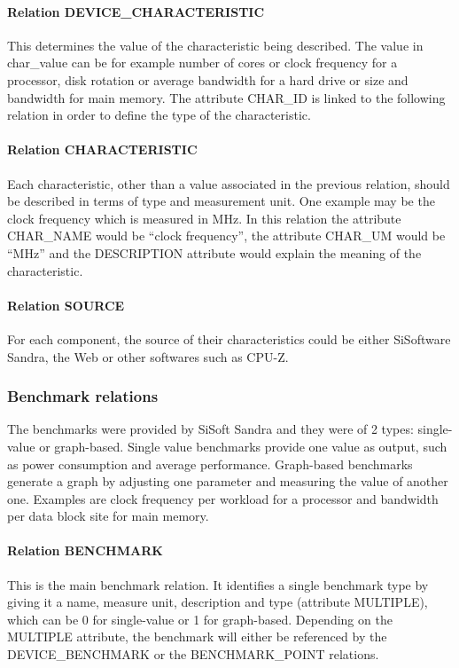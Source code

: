         \paragraph*{Relation DEVICE\_CHARACTERISTIC}
            This determines the value of the characteristic being described. The value in char_value can be for example number of cores or clock frequency for a processor, disk rotation or average bandwidth for a hard drive or size and bandwidth for main memory. The attribute CHAR_ID is linked to the following relation in order to define the type of the characteristic.
            
        \paragraph*{Relation CHARACTERISTIC}
            Each characteristic, other than a value associated in the previous relation, should be described in terms of type and measurement unit. One example may be the clock frequency which is measured in MHz. In this relation the attribute CHAR_NAME would be ``clock frequency'', the attribute CHAR_UM would be ``MHz'' and the DESCRIPTION attribute would explain the meaning of the characteristic.
            
        \paragraph*{Relation SOURCE}
            For each component, the source of their characteristics could be either SiSoftware Sandra, the Web or other softwares such as CPU-Z.
            
    \subsubsection*{Benchmark relations}
        The benchmarks were provided by SiSoft Sandra and they were of 2 types: single-value or graph-based. Single value benchmarks provide one value as output, such as power consumption and average performance. Graph-based benchmarks generate a graph by adjusting one parameter and measuring the value of another one. Examples are clock frequency per workload for a processor and bandwidth per data block site for main memory.
        \paragraph*{Relation BENCHMARK}
            This is the main benchmark relation. It identifies a single benchmark type by giving it a name, measure unit, description and type (attribute MULTIPLE), which can be 0 for single-value or 1 for graph-based. Depending on the MULTIPLE attribute, the benchmark will either be referenced by the DEVICE_BENCHMARK or the BENCHMARK_POINT relations.


